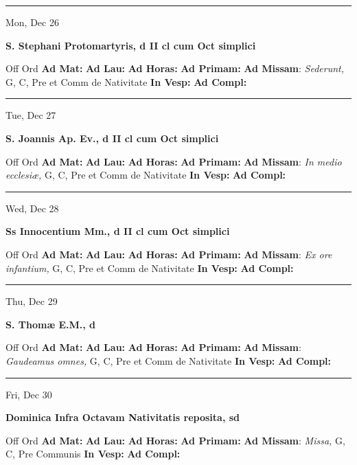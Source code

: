 \documentclass[letterpaper, 10pt]{article}
\begin{document}
\hrule
\begin{center}
Mon, Dec 26
\end{center}\textbf{ \large S. Stephani Protomartyris, \textnormal{\normalsize d II cl cum Oct simplici}}
\begin{justify}
Off Ord
\textbf{Ad Mat: }
\textbf{Ad Lau: }
\textbf{Ad Horas: }
\textbf{Ad Primam: }
\textbf{Ad Missam}: \textit{Sederunt,} G, C, Pre et Comm de Nativitate
\textbf{In Vesp: }
\textbf{Ad Compl: }\end{justify}



\hrule
\begin{center}
Tue, Dec 27
\end{center}\textbf{ \large S. Joannis Ap. Ev., \textnormal{\normalsize d II cl cum Oct simplici}}
\begin{justify}
Off Ord
\textbf{Ad Mat: }
\textbf{Ad Lau: }
\textbf{Ad Horas: }
\textbf{Ad Primam: }
\textbf{Ad Missam}: \textit{In medio ecclesiæ,} G, C, Pre et Comm de Nativitate
\textbf{In Vesp: }
\textbf{Ad Compl: }\end{justify}



\hrule
\begin{center}
Wed, Dec 28
\end{center}\textbf{ \large Ss Innocentium Mm., \textnormal{\normalsize d II cl cum Oct simplici}}
\begin{justify}
Off Ord
\textbf{Ad Mat: }
\textbf{Ad Lau: }
\textbf{Ad Horas: }
\textbf{Ad Primam: }
\textbf{Ad Missam}: \textit{Ex ore infantium,} G, C, Pre et Comm de Nativitate
\textbf{In Vesp: }
\textbf{Ad Compl: }\end{justify}



\hrule
\begin{center}
Thu, Dec 29
\end{center}\textbf{ \large S. Thomæ E.M., \textnormal{\normalsize d}}
\begin{justify}
Off Ord
\textbf{Ad Mat: }
\textbf{Ad Lau: }
\textbf{Ad Horas: }
\textbf{Ad Primam: }
\textbf{Ad Missam}: \textit{Gaudeamus omnes,} G, C, Pre et Comm de Nativitate
\textbf{In Vesp: }
\textbf{Ad Compl: }\end{justify}



\hrule
\begin{center}
Fri, Dec 30
\end{center}\textbf{ \large Dominica Infra Octavam Nativitatis reposita, \textnormal{\normalsize sd}}
\begin{justify}
Off Ord
\textbf{Ad Mat: }
\textbf{Ad Lau: }
\textbf{Ad Horas: }
\textbf{Ad Primam: }
\textbf{Ad Missam}: \textit{Missa,} G, C, Pre Communis
\textbf{In Vesp: }
\textbf{Ad Compl: }\end{justify}
\end{document}
